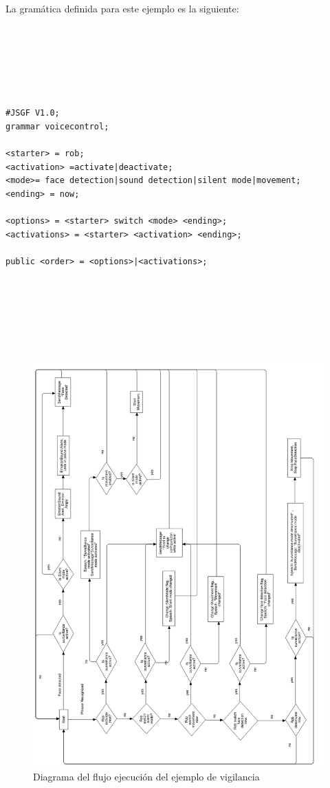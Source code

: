 La gramática definida para este ejemplo es la siguiente:

\begin{verbatim}






#JSGF V1.0;
grammar voicecontrol;

<starter> = rob;
<activation> =activate|deactivate;
<mode>= face detection|sound detection|silent mode|movement;
<ending> = now;

<options> = <starter> switch <mode> <ending>;
<activations> = <starter> <activation> <ending>;

public <order> = <options>|<activations>;







\end{verbatim}


\begin{figure}
	\centering
	\includegraphics[width=1\linewidth]{imagenes/vigilante_diagram.png}
	\caption{Diagrama del flujo  ejecución del ejemplo de vigilancia}
	\label{fig:vigilante-diagram}
\end{figure} 


